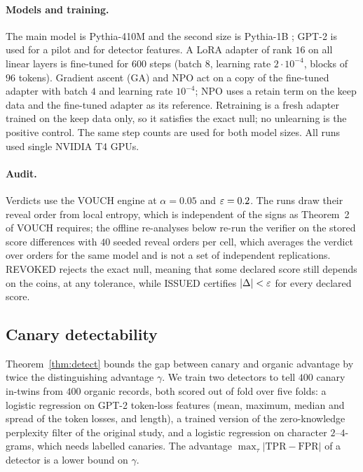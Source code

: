 \paragraph{Models and training.} The main model is Pythia-410M and the second size is
Pythia-1B \citep{biderman2023pythia}; GPT-2 \citep{radford2019gpt2} is used for a pilot
and for detector features. A LoRA adapter \citep{hu2022lora} of rank $16$ on all linear
layers is fine-tuned for $600$ steps (batch $8$, learning rate $2\cdot10^{-4}$, blocks of
$96$ tokens). Gradient ascent (GA) and NPO \citep{zhang2024npo} act on a copy of the
fine-tuned adapter with batch $4$ and learning rate $10^{-4}$; NPO uses a retain term on
the keep data and the fine-tuned adapter as its reference. Retraining is a fresh adapter
trained on the keep data only, so it satisfies the exact null; no unlearning is the
positive control. The same step counts are used for both model sizes. All runs used
single NVIDIA T4 GPUs.

\paragraph{Audit.} Verdicts use the VOUCH engine at $\alpha=0.05$ and $\varepsilon=0.2$. The runs
draw their reveal order from local entropy, which is independent of the signs as
Theorem~2 of VOUCH requires; the offline re-analyses below re-run the verifier on the
stored score differences with $40$ seeded reveal orders per cell, which averages the
verdict over orders for the same model and is not a set of independent replications.
REVOKED rejects the exact null, meaning that some declared score still depends on the
coins, at any tolerance, while ISSUED certifies $|\Delta|<\varepsilon$ for every declared score.

\subsection{Canary detectability}\label{sec:exp-detect}

Theorem~\ref{thm:detect} bounds the gap between canary and organic advantage by twice the
distinguishing advantage $\gamma$. We train two detectors to tell $400$ canary in-twins
from $400$ organic records, both scored out of fold over five folds: a logistic
regression on GPT-2 token-loss features (mean, maximum, median and spread of the token
losses, and length), a trained version of the zero-knowledge perplexity filter of the
original study, and a logistic regression on character $2$--$4$-grams, which needs
labelled canaries. The advantage $\max_\tau|\mathrm{TPR}-\mathrm{FPR}|$ of a detector is a
lower bound on $\gamma$.

